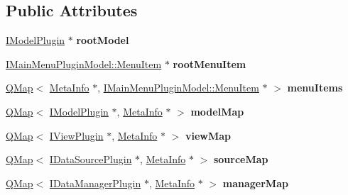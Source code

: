 \subsection*{Public Attributes}
\begin{DoxyCompactItemize}
\item 
\hyperlink{class_i_model_plugin}{I\+Model\+Plugin} $\ast$ {\bfseries root\+Model}\hypertarget{class_plugin_linker_ab1ecde85d4d754ee95f8c52e3eddc265}{}\label{class_plugin_linker_ab1ecde85d4d754ee95f8c52e3eddc265}

\item 
\hyperlink{struct_i_main_menu_plugin_model_1_1_menu_item}{I\+Main\+Menu\+Plugin\+Model\+::\+Menu\+Item} $\ast$ {\bfseries root\+Menu\+Item}\hypertarget{class_plugin_linker_a44b3d50d05723673e3682a9987621ee3}{}\label{class_plugin_linker_a44b3d50d05723673e3682a9987621ee3}

\item 
\hyperlink{class_q_map}{Q\+Map}$<$ \hyperlink{struct_meta_info}{Meta\+Info} $\ast$, \hyperlink{struct_i_main_menu_plugin_model_1_1_menu_item}{I\+Main\+Menu\+Plugin\+Model\+::\+Menu\+Item} $\ast$ $>$ {\bfseries menu\+Items}\hypertarget{class_plugin_linker_aebd5426ad88d05de6dc358c2697e143f}{}\label{class_plugin_linker_aebd5426ad88d05de6dc358c2697e143f}

\item 
\hyperlink{class_q_map}{Q\+Map}$<$ \hyperlink{class_i_model_plugin}{I\+Model\+Plugin} $\ast$, \hyperlink{struct_meta_info}{Meta\+Info} $\ast$ $>$ {\bfseries model\+Map}\hypertarget{class_plugin_linker_adb1fa516735cef59600dbe5777499841}{}\label{class_plugin_linker_adb1fa516735cef59600dbe5777499841}

\item 
\hyperlink{class_q_map}{Q\+Map}$<$ \hyperlink{class_i_view_plugin}{I\+View\+Plugin} $\ast$, \hyperlink{struct_meta_info}{Meta\+Info} $\ast$ $>$ {\bfseries view\+Map}\hypertarget{class_plugin_linker_a9703ef182dce1dcb24e83110d98933f1}{}\label{class_plugin_linker_a9703ef182dce1dcb24e83110d98933f1}

\item 
\hyperlink{class_q_map}{Q\+Map}$<$ \hyperlink{class_i_data_source_plugin}{I\+Data\+Source\+Plugin} $\ast$, \hyperlink{struct_meta_info}{Meta\+Info} $\ast$ $>$ {\bfseries source\+Map}\hypertarget{class_plugin_linker_a452d0698f6ea36e83c8094444bdfd59f}{}\label{class_plugin_linker_a452d0698f6ea36e83c8094444bdfd59f}

\item 
\hyperlink{class_q_map}{Q\+Map}$<$ \hyperlink{class_i_data_manager_plugin}{I\+Data\+Manager\+Plugin} $\ast$, \hyperlink{struct_meta_info}{Meta\+Info} $\ast$ $>$ {\bfseries manager\+Map}\hypertarget{class_plugin_linker_af19a364f23b397652828ce411c48e414}{}\label{class_plugin_linker_af19a364f23b397652828ce411c48e414}

\end{DoxyCompactItemize}


